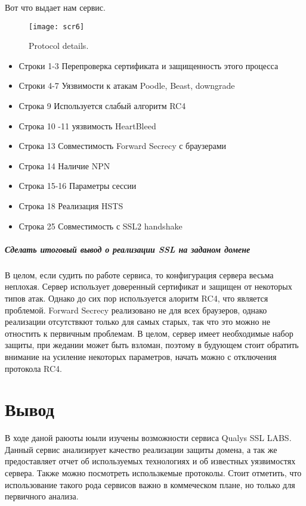 \documentclass{article}
\begin{document}
Вот что выдает нам сервис.
\begin{figure}[h!]
	\centering
	\texttt{[image: scr6]}
	\caption{ Protocol  details.}
\end{figure}
\begin{itemize}
	\item Строки 1-3 Перепроверка сертификата и защищенность этого процесса
	\item Строки 4-7 Уязвимости к атакам Poodle, Beast, downgrade
	\item Строка 9 Используется слабый алгоритм RC4
	\item Строка 10 -11 уязвимость HeartBleed
	\item Строка 13 Совместимость Forward Secrecy с браузерами
	\item Строка 14 Наличие NPN
	\item Строка 15-16 Параметры сессии
	\item Строка 18 Реализация HSTS
	\item Строка 25 Совместимость с SSL2 handshake
\end{itemize}


\subparagraph{Сделать итоговый вывод о реализации SSL на заданом домене}

В целом, если судить по работе сервиса, то конфигурация сервера весьма неплохая. Сервер использует доверенный сертификат и защищен от некоторых типов атак. Однако до сих пор используется алоритм RC4, что является проблемой. Forward Secrecy реализовано не для всех браузеров, однако реализации отсутствкют только для самых старых, так что это можно не отностить к первичным проблемам. В целом, сервер имеет необходимые набор защиты, при жедании может быть взломан, поэтому в будующем стоит обратить внимание на усиление некоторых параметров, начать можно с отключения протокола RC4.
\section{Вывод}
В ходе даной раюоты юыли изучены возможности сервиса Qualys SSL LABS. Данный сервис анализирует качество реализации защиты домена, а так же предоставляет отчет об используемых технологиях и об известных уязвимостях сервера. Также можно посмотреть использкемые протоколы.
Стоит отметить, что использование такого рода сервисов важно в коммеческом плане, но только для первичного анализа.
\end{document}
